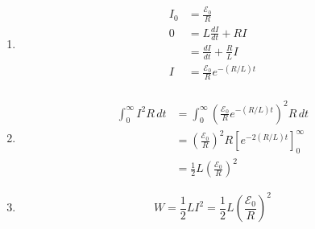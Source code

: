 \documentclass{article}
\begin{document}
\subsection{}

\begin{enumerate}
  \item

        \begin{align*}
          I_0 & = \frac{\mathcal{E}_0}{R}                \\
          0   & = L \frac{d I}{d t} + R I                \\
              & = \frac{d I}{d t} + \frac{R}{L} I        \\
          I   & = \frac{\mathcal{E}_0}{R} e^{-(R / L) t} \\
        \end{align*}

  \item

        \begin{align*}
          \int_0^\infty I^2 R \,d t & = \int_0^\infty \left( \frac{\mathcal{E}_0}{R} e^{-(R / L) t} \right)^2 R \,d t       \\
                                    & = \left( \frac{\mathcal{E}_0}{R} \right)^2 R \left[ e^{-2 (R / L) t} \right]_0^\infty \\
                                    & = \frac{1}{2} L \left( \frac{\mathcal{E}_0}{R} \right)^2
        \end{align*}

  \item \[W = \frac{1}{2} L I^2 = \frac{1}{2} L \left( \frac{\mathcal{E}_0}{R} \right)^2\]
\end{enumerate}
\end{document}
